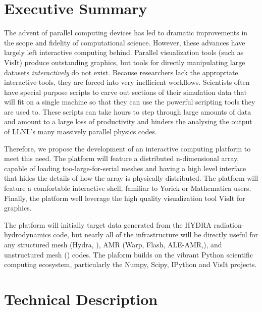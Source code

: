 \documentclass[a4paper]{article}
\begin{document}

\setlength{\parindent}{15pt}
\section*{Executive Summary }

The advent of parallel computing devices has led to dramatic improvements in the scope and fidelity of computational science.  However, these advances have largely left interactive computing behind.  Parallel visualization tools (such as VisIt) produce outstanding graphics, but tools for directly manipulating large datasets \emph{interactively} do not exist.  Because researchers lack the appropriate interactive tools, they are forced into very inefficient workflows.  Scientists often have special purpose scripts to carve out sections of their simulation data that will fit on a single machine so that they can use the powerful scripting tools they are used to.  These scripts can take hours to step through large amounts of data and amount to a large loss of productivity and hinders the analysing the output of LLNL's many massively parallel physics codes.

Therefore, we propose the development of an interactive computing platform to meet this need.  The platform will feature a distributed n-dimensional array, capable of loading too-large-for-serial meshes and having a high level interface that hides the details of how the array is physically distributed.  The platform will feature a comfortable interactive shell, familiar to Yorick or Mathematica users.  Finally, the platform well leverage the high quality visualization tool VisIt for graphics.

The platform will initially target data generated from the HYDRA\cite{Marinak2001} radiation-hydrodynamics code, but nearly all of the infrastructure will be directly useful for any structured mesh (Hydra, ), AMR (Warp\cite{Grote2005}, Flash\cite{flash}, ALE-AMR\cite{Koniges2010},), and unstructured mesh () codes.  The plaform builds on the vibrant Python scientific computing ecosystem, particularly the Numpy\cite{Oliphant2006}, Scipy\cite{numpyscipy}, IPython\cite{ipython} and VisIt\cite{VisIt} projects.


\section*{Technical Description}
\end{document}
